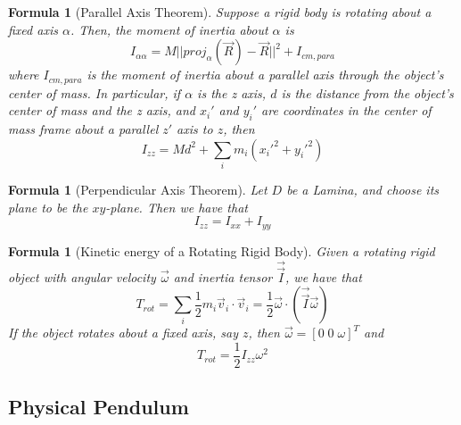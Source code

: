 \documentclass[12pt]{article}
\newtheorem{for}[thm]{Formula}
\theoremstyle{definition}
\theoremstyle{remark}
\numberwithin{equation}{section}
\begin{document}
\vspace{15pt}


\begin{for}[Parallel Axis Theorem]
        Suppose a rigid body is rotating about a fixed axis $\alpha$. Then, the moment of inertia about $\alpha$ is \begin{equation}
                I_{\alpha\alpha} = M||proj_{\alpha}(\vec{R}) - \vec{R}||^2 + I_{cm,para}
        \end{equation}
        where $I_{cm,para}$ is the moment of inertia about a parallel axis through the object's center of mass. In particular, if $\alpha$ is the z axis, $d$ is the distance from the object's center of mass and the z axis, and $x_i'$ and $y_i'$ are coordinates in the center of mass frame about a parallel $z'$ axis to $z$, then \begin{equation}
                I_{zz} = Md^2+\sum_im_i(x_i'^2+y_i'^2)
        \end{equation}
\end{for}


\vspace{15pt}

\begin{for}[Perpendicular Axis Theorem]
        Let $D$ be a Lamina, and choose its plane to be the $xy$-plane. Then we have that \begin{equation}
                I_{zz} = I_{xx} + I_{yy}
        \end{equation}
\end{for}

\vspace{15pt}

\begin{for}[Kinetic energy of a Rotating Rigid Body]
        Given a rotating rigid object with angular velocity $\vec{\omega}$ and inertia tensor $\vec{\vec{I}}$, we have that \begin{equation}
                T_{rot} = \sum_i\frac{1}{2}m_i\vec{v}_i \cdot \vec{v}_i = \frac{1}{2}\vec{\omega} \cdot (\vec{\vec{I}}\vec{\omega})
        \end{equation}
        If the object rotates about a fixed axis, say $z$, then $\vec{\omega} = [0\;0\;\omega]^T$ and \begin{equation}
                T_{rot} = \frac{1}{2}I_{zz}\omega^2
        \end{equation}
\end{for}



\subsection{Physical Pendulum}
\end{document}
